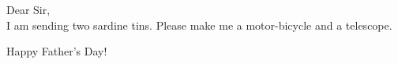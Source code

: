 \documentclass[12 pt]{article}
\begin{document}
\begin{frontcover}
Dear Sir,\\
I am sending two sardine tins.
Please make me a motor-bicycle and a telescope.
\end{frontcover}
\begin{insideright}
Happy Father's Day!
\end{insideright}
\end{document}
